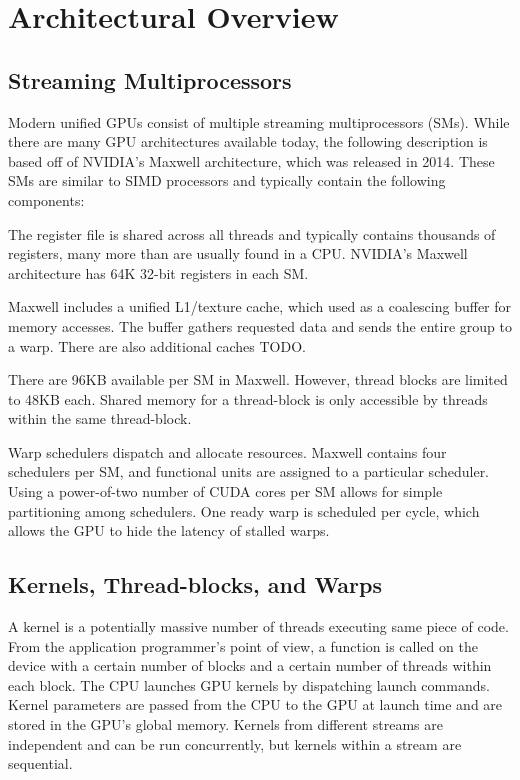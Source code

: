 \documentclass[prodmode,acmtecs]{acmsmall} %
\begin{document}
\section{Architectural Overview} \label{sec:architecture}
\subsection{Streaming Multiprocessors}
Modern unified GPUs consist of multiple streaming multiprocessors (SMs). While
there are many GPU architectures available today, the following description is
based off of NVIDIA's Maxwell architecture, which was released in 2014. These
SMs are similar to SIMD processors and typically contain the following
components:
\begin{description}
  \setlength\itemsep{1em}
  \item[A large register file] The register file is shared across all threads
  and typically contains thousands of registers, many more than are usually
  found in a CPU. NVIDIA's Maxwell architecture has 64K 32-bit registers in each
  SM.
  \item[Multiple caches] Maxwell includes a unified L1/texture cache, which used
  as a coalescing buffer for memory accesses. The buffer gathers requested data
  and sends the entire group to a warp. There are also additional caches TODO.
  \item[Shared memory] There are 96KB available per SM in Maxwell. However, thread blocks
  are limited to 48KB each. Shared memory for a thread-block is only accessible
  by threads within the same thread-block.
  \item[Multiple warp schedulers] Warp schedulers dispatch and allocate
  resources. Maxwell contains four schedulers per SM, and functional units are
  assigned to a particular scheduler. Using a power-of-two number of CUDA cores
  per SM allows for simple partitioning among schedulers. One ready warp is
  scheduled per cycle, which allows the GPU to hide the latency of stalled
  warps.
\end{description}

\subsection{Kernels, Thread-blocks, and Warps}
A kernel is a potentially massive number of threads executing same piece of
code. From the application programmer's point of view, a function is called on
the device with a certain number of blocks and a certain number of threads
within each block. The CPU launches GPU kernels by dispatching launch commands.
Kernel parameters are passed from the CPU to the GPU at launch time and are
stored in the GPU's global memory. Kernels from different streams are
independent and can be run concurrently, but kernels within a stream are
sequential.
\end{document}
